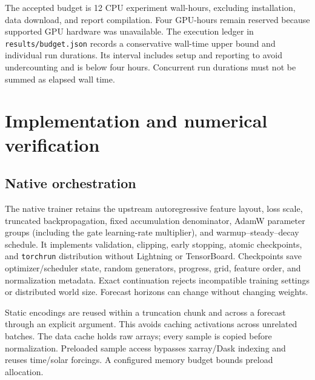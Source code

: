 \documentclass[10pt]{article}
\begin{document}
The accepted budget is 12 CPU experiment wall-hours, excluding installation,
data download, and report compilation. Four GPU-hours remain reserved because
supported GPU hardware was unavailable. The execution ledger in
\texttt{results/budget.json} records a conservative wall-time upper bound and
individual run durations. Its interval includes setup and reporting to avoid
undercounting and is below four hours. Concurrent run durations must not be summed
as elapsed wall time.

\section{Implementation and numerical verification}
\subsection{Native orchestration}
The native trainer retains the upstream autoregressive feature layout, loss scale,
truncated backpropagation, fixed accumulation denominator, AdamW parameter groups
(including the gate learning-rate multiplier), and warmup--steady--decay schedule.
It implements validation, clipping, early stopping, atomic checkpoints, and
\texttt{torchrun} distribution without Lightning or TensorBoard. Checkpoints save
optimizer/scheduler state, random generators, progress, grid, feature order, and
normalization metadata. Exact continuation rejects incompatible training settings
or distributed world size. Forecast horizons can change without changing weights.

Static encodings are reused within a truncation chunk and across a forecast through
an explicit argument. This avoids caching activations across unrelated batches.
The data cache holds raw arrays; every sample is copied before normalization.
Preloaded sample access bypasses xarray/Dask indexing and reuses time/solar forcings.
A configured memory budget bounds preload allocation.
\end{document}
